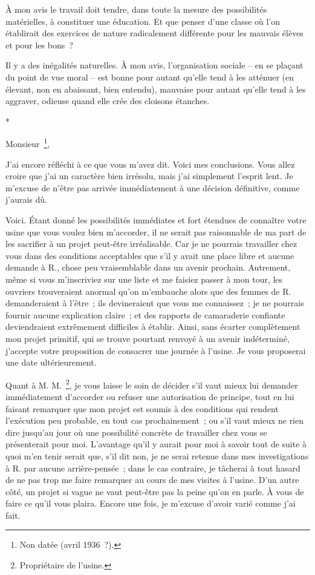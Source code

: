 \documentclass[french,twoside]{book} %
\begin{document}
À mon avis le travail doit tendre, dans toute la mesure des possibilités matérielles, à constituer une éducation. Et que penser d'une classe où l'on établirait des exercices de nature radicalement différente pour les mauvais élèves et pour les bons ?\par
Il y a des inégalités naturelles. À mon avis, l'organisation sociale – en se plaçant du point de vue moral – est bonne pour autant qu'elle tend à les atténuer (en élevant, non en abaissant, bien entendu), mauvaise pour autant qu'elle tend à les aggraver, odieuse quand elle crée des cloisons étanches.\par

\begin{center}
*\end{center}
\noindent Monsieur \footnote{Non datée (avril 1936 ?).},\par
J'ai encore réfléchi à ce que vous m'avez dit. Voici mes conclusions. Vous allez croire que j'ai un caractère bien irrésolu, mais j'ai simplement l'esprit lent. Je m'excuse de n'être pas arrivée immédiatement à une décision définitive, comme j'aurais dû.\par
Voici. Étant donné les possibilités immédiates et fort étendues de connaître votre usine que vous voulez bien m’accorder, il ne serait pas raisonnable de ma part de les sacrifier à un projet peut-être irréalisable. Car je ne pourrais travailler chez vous dans des conditions acceptables que s'il y avait une place libre et aucune demande à R., chose peu vraisemblable dans un avenir prochain. Autrement, même si vous m'inscriviez sur une liste et me faisiez passer à mon tour, les ouvriers trouveraient anormal qu'on m'embauche alors que des femmes de R. demanderaient à l'être ; ils devineraient que vous me connaissez ; je ne pourrais fournir aucune explication claire ; et des rapports de camaraderie confiante deviendraient extrêmement difficiles à établir. Ainsi, sans écarter complètement mon projet primitif, qui se trouve pourtant renvoyé à un avenir indéterminé, j'accepte votre proposition de consacrer une journée à l'usine. Je vous proposerai une date ultérieurement.\par
Quant à M. M. \footnote{Propriétaire de l’usine.}, je vous laisse le soin de décider s'il vaut mieux lui demander immédiatement d'accorder ou refuser une autorisation de principe, tout en lui faisant remarquer que mon projet est soumis à des conditions qui rendent l'exécution peu probable, en tout cas prochainement ; ou s'il vaut mieux ne rien dire jusqu'au jour où une possibilité concrète de travailler chez vous se présenterait pour moi. L'avantage qu'il y aurait pour moi à savoir tout de suite à quoi m'en tenir serait que, s'il dit non, je ne serai retenue dans mes investigations à R. par aucune arrière-pensée ; dans le cas contraire, je tâcherai à tout hasard de ne pas trop me faire remarquer au cours de mes visites à l'usine. D'un autre côté, un projet si vague ne vaut peut-être pas la peine qu'on en parle. À vous de faire ce qu'il vous plaira. Encore une fois, je m'excuse d'avoir varié comme j'ai fait.\par
\end{document}
